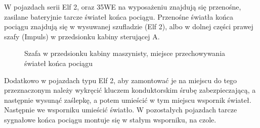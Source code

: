 W pojazdach serii Elf 2, oraz 35WE na wyposażeniu znajdują się przenośne, zasilane bateryjnie tarcze świateł końca pociągu. Przenośne światła końca pociągu znajdują się w wysuwanej szufladzie (Elf 2), albo w dolnej części prawej szafy (Impuls) w przedsionku kabiny sterującej A.

\begin{figure}
		\caption{Szafa w przedsionku kabiny maszynisty, miejsce przechowywania świateł końca pociągu}
\end{figure}
Dodatkowo w pojazdach typu Elf 2, aby zamontować je na miejscu do tego przeznaczonym należy wykręcić kluczem konduktorskim śrubę zabezpieczającą, a następnie wysunąć zaślepkę, a potem umieścić w tym miejscu wspornik świateł. Następnie we wsporniku umieścić światło. W pozostałych pojazdach tarcze sygnałowe końca pociągu montuje się w stałym wsporniku, na czole.

